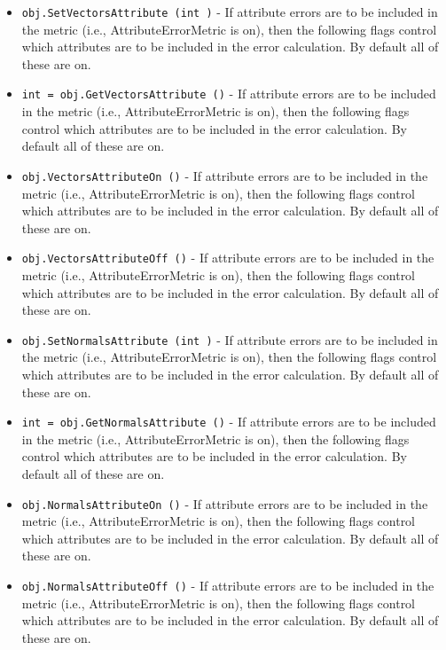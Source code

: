 \begin{itemize}
\item  \verb|obj.SetVectorsAttribute (int )| -  If attribute errors are to be included in the metric (i.e.,
 AttributeErrorMetric is on), then the following flags control which
 attributes are to be included in the error calculation. By default all
 of these are on.

\item  \verb|int = obj.GetVectorsAttribute ()| -  If attribute errors are to be included in the metric (i.e.,
 AttributeErrorMetric is on), then the following flags control which
 attributes are to be included in the error calculation. By default all
 of these are on.

\item  \verb|obj.VectorsAttributeOn ()| -  If attribute errors are to be included in the metric (i.e.,
 AttributeErrorMetric is on), then the following flags control which
 attributes are to be included in the error calculation. By default all
 of these are on.

\item  \verb|obj.VectorsAttributeOff ()| -  If attribute errors are to be included in the metric (i.e.,
 AttributeErrorMetric is on), then the following flags control which
 attributes are to be included in the error calculation. By default all
 of these are on.

\item  \verb|obj.SetNormalsAttribute (int )| -  If attribute errors are to be included in the metric (i.e.,
 AttributeErrorMetric is on), then the following flags control which
 attributes are to be included in the error calculation. By default all
 of these are on.

\item  \verb|int = obj.GetNormalsAttribute ()| -  If attribute errors are to be included in the metric (i.e.,
 AttributeErrorMetric is on), then the following flags control which
 attributes are to be included in the error calculation. By default all
 of these are on.

\item  \verb|obj.NormalsAttributeOn ()| -  If attribute errors are to be included in the metric (i.e.,
 AttributeErrorMetric is on), then the following flags control which
 attributes are to be included in the error calculation. By default all
 of these are on.

\item  \verb|obj.NormalsAttributeOff ()| -  If attribute errors are to be included in the metric (i.e.,
 AttributeErrorMetric is on), then the following flags control which
 attributes are to be included in the error calculation. By default all
 of these are on.


\end{itemize}
